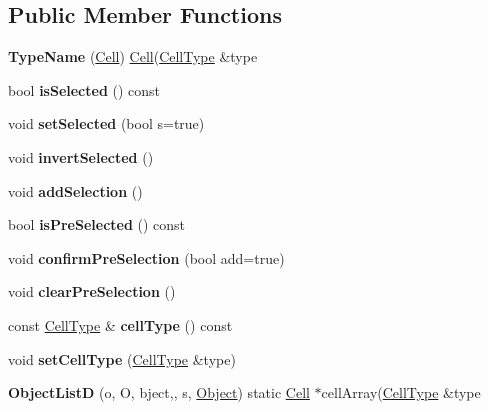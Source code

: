 \subsection*{\-Public \-Member \-Functions}
\begin{DoxyCompactItemize}
\item 
\hypertarget{class_cell_af6817ea38b4a055aef1eab862b412bd4}{{\bfseries \-Type\-Name} (\hyperlink{class_cell}{\-Cell}) \hyperlink{class_cell}{\-Cell}(\hyperlink{class_cell_type}{\-Cell\-Type} \&type}\label{class_cell_af6817ea38b4a055aef1eab862b412bd4}

\item 
\hypertarget{class_cell_a394830e18401f3b414c3dde4a2b4e2e8}{bool {\bfseries is\-Selected} () const }\label{class_cell_a394830e18401f3b414c3dde4a2b4e2e8}

\item 
\hypertarget{class_cell_a40146bbb2b74cf56337462abc4d0327c}{void {\bfseries set\-Selected} (bool s=true)}\label{class_cell_a40146bbb2b74cf56337462abc4d0327c}

\item 
\hypertarget{class_cell_ad8310bd5ddbdcb3ab3036356556b32b3}{void {\bfseries invert\-Selected} ()}\label{class_cell_ad8310bd5ddbdcb3ab3036356556b32b3}

\item 
\hypertarget{class_cell_a9801c2d435d44834bd14a80fba778618}{void {\bfseries add\-Selection} ()}\label{class_cell_a9801c2d435d44834bd14a80fba778618}

\item 
\hypertarget{class_cell_aa7456089022c5d2dabd4325d03007759}{bool {\bfseries is\-Pre\-Selected} () const }\label{class_cell_aa7456089022c5d2dabd4325d03007759}

\item 
\hypertarget{class_cell_a16f6d41be75c42ad20ad29d0b5725ece}{void {\bfseries confirm\-Pre\-Selection} (bool add=true)}\label{class_cell_a16f6d41be75c42ad20ad29d0b5725ece}

\item 
\hypertarget{class_cell_aa0704872b8d4ae7f40022cfebfa48944}{void {\bfseries clear\-Pre\-Selection} ()}\label{class_cell_aa0704872b8d4ae7f40022cfebfa48944}

\item 
\hypertarget{class_cell_a218280087c0d77011b0d93d3f56e1b8f}{const \hyperlink{class_cell_type}{\-Cell\-Type} \& {\bfseries cell\-Type} () const }\label{class_cell_a218280087c0d77011b0d93d3f56e1b8f}

\item 
\hypertarget{class_cell_aa7247ed72579ece05d6937de36ad5d55}{void {\bfseries set\-Cell\-Type} (\hyperlink{class_cell_type}{\-Cell\-Type} \&type)}\label{class_cell_aa7247ed72579ece05d6937de36ad5d55}

\item 
\hypertarget{class_cell_ad0fd3d547365e2f04de777f171277f45}{{\bfseries \-Object\-List\-D} (o, \-O, bject,, s, \hyperlink{class_object}{\-Object}) static \hyperlink{class_cell}{\-Cell} $\ast$cell\-Array(\hyperlink{class_cell_type}{\-Cell\-Type} \&type}\label{class_cell_ad0fd3d547365e2f04de777f171277f45}

\end{DoxyCompactItemize}

